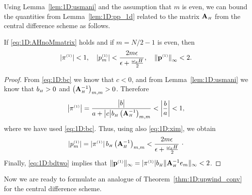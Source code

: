 Using Lemma~\ref{lem:1D:usmani} and the assumption that $m$ is even, we can
bound the quantities from Lemma~\ref{lem:1D:pp_1d} related to the matrix
$\mathbf{A}_{\scriptscriptstyle H}$ from the central difference scheme as follows.

\begin{lemma}\label{lem:pm}
If \eqref{eq:1D:AHnoMmatrix} holds and if $m=N/2-1$ is even, then
%
\begin{equation*}%
\left|\piOne\right|<1,\quad
\left|p^{\klein{(1)}}_{m}\right|< \frac{2m\epsilon}{\epsilon+\frac{\omega_x H}{2}},\quad
\left\|\pOne\right\|_\infty<2.
\end{equation*}
%
\end{lemma}

\begin{proof}
From \eqref{eq:1D:bc} we know that $c<0$, and from Lemma~\ref{lem:1D:usmani} we know
that $b_{\scriptscriptstyle H}>0$ and $\left(\mathbf{A}_{\scriptscriptstyle H}^{-1}\right)_{m,m}>0$. Therefore
%
$$\bigl|\pi^{\scriptscriptstyle (1)}\bigr|=
\frac{\bigl|b\bigr|}{a+\bigl|c\bigr|b_{\scriptscriptstyle H}\left(\mathbf{A}_{\scriptscriptstyle H}^{-1}\right)_{m,m}}<
\left|\frac{b}{a}\right|<1,$$
%
where we have used \eqref{eq:1D:bc}. Thus, using also \eqref{eq:1D:xim}, we obtain
%
$$\left|p^{\scriptscriptstyle (1)}_{m}\right|=|\pi^{\scriptscriptstyle (1)}|\,b_{\scriptscriptstyle H}\left(\mathbf{A}_{\scriptscriptstyle H}^{-1}\right)_{m,m}<
\frac{2m\epsilon}{\epsilon+\frac{\omega_x H}{2}} ~\cdot$$
%
Finally, \eqref{eq:1D:bdtwo} implies that
$\| \mathbf{p}^{\scriptscriptstyle (1)}\|_\infty = |\pi^{\scriptscriptstyle (1)}| b_{\scriptscriptstyle H} \|\mathbf{A}_{\scriptscriptstyle H}^{-1}e_m\|_\infty <2$.
%
\end{proof}

Now we are ready to formulate an analogue of Theorem~\ref{thm:1D:upwind_conv}
for the central difference scheme.

